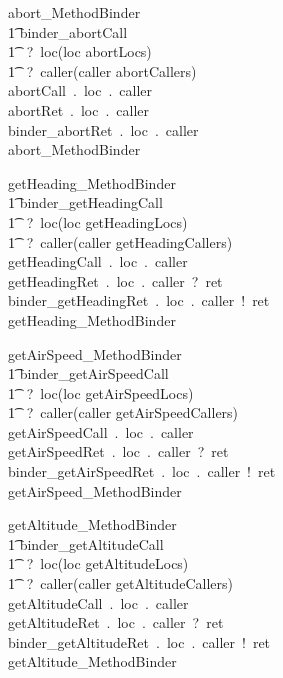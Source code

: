 %
%
\begin{circusaction}
abort\_MethodBinder \circdef \\
	\t1 \circblockopen
	binder\_abortCall\\ \t1 ~?~loc\prefixcolon(loc \in abortLocs)\\ \t1 ~?~caller\prefixcolon(caller \in abortCallers)  \then \\
	abortCall~.~loc~.~caller  \then \\
	abortRet~.~loc~.~caller \then \\
	binder\_abortRet~.~loc~.~caller  \then \\
	abort\_MethodBinder
	\circblockclose
\end{circusaction}
%
%
\begin{circusaction}
getHeading\_MethodBinder \circdef \\
	\t1 \circblockopen
	binder\_getHeadingCall\\ \t1 ~?~loc\prefixcolon(loc \in getHeadingLocs)\\ \t1 ~?~caller\prefixcolon(caller \in getHeadingCallers)  \then \\
	getHeadingCall~.~loc~.~caller  \then \\
	getHeadingRet~.~loc~.~caller~?~ret \then \\
	binder\_getHeadingRet~.~loc~.~caller~!~ret  \then \\
	getHeading\_MethodBinder
	\circblockclose
\end{circusaction}
%
%
\begin{circusaction}
getAirSpeed\_MethodBinder \circdef \\
	\t1 \circblockopen
	binder\_getAirSpeedCall\\ \t1 ~?~loc\prefixcolon(loc \in getAirSpeedLocs)\\ \t1 ~?~caller\prefixcolon(caller \in getAirSpeedCallers)  \then \\
	getAirSpeedCall~.~loc~.~caller  \then \\
	getAirSpeedRet~.~loc~.~caller~?~ret \then \\
	binder\_getAirSpeedRet~.~loc~.~caller~!~ret  \then \\
	getAirSpeed\_MethodBinder
	\circblockclose
\end{circusaction}
%
%
\begin{circusaction}
getAltitude\_MethodBinder \circdef \\
	\t1 \circblockopen
	binder\_getAltitudeCall\\ \t1 ~?~loc\prefixcolon(loc \in getAltitudeLocs)\\ \t1 ~?~caller\prefixcolon(caller \in getAltitudeCallers)  \then \\
	getAltitudeCall~.~loc~.~caller  \then \\
	getAltitudeRet~.~loc~.~caller~?~ret \then \\
	binder\_getAltitudeRet~.~loc~.~caller~!~ret  \then \\
	getAltitude\_MethodBinder
	\circblockclose
\end{circusaction}
